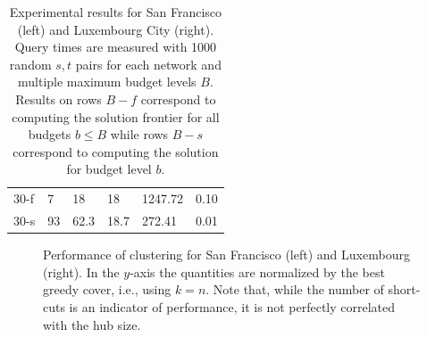 \begin{table}
{\begin{tabular}{ | l | p{1cm} | p{1cm} | p{1cm} | p{1.2cm} | p{1.2cm} |}
30-f & 7  & 18   & 18   & 1247.72 & 0.10 \\
30-s & 93 & 62.3 & 18.7 & 272.41  & 0.01 \\ \hline
\end{tabular}%
}
\vspace{13pt}
\caption{Experimental results for San Francisco (left) and Luxembourg City (right). Query times are measured with 1000 random $s,t$ pairs for each network and multiple maximum budget levels $B$. Results on rows $B-f$ correspond to computing the solution frontier for all budgets $b\leq B$ while rows $B-s$ correspond to computing the solution for budget level $b$.}
\label{tab:performance_results}
\end{table}



\begin{figure}
\caption{Performance of clustering for San Francisco (left) and Luxembourg (right). 
In the $y$-axis the quantities are normalized by the best greedy cover, i.e., using $k=n$.
Note that, while the number of short-cuts is an indicator of performance, it is not perfectly correlated with the hub size.}
\label{fig:clusters}
\end{figure}


